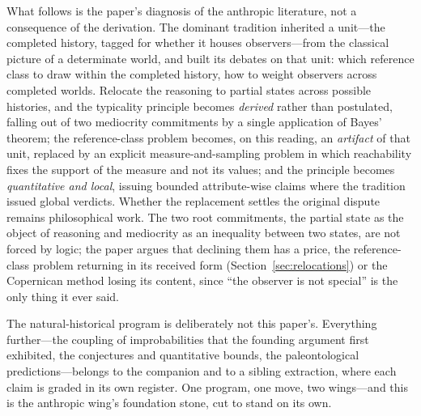 What follows is the paper's diagnosis of the anthropic literature, not a consequence of the derivation. The dominant tradition inherited a unit---the completed history, tagged for whether it houses observers---from the classical picture of a determinate world, and built its debates on that unit: which reference class to draw within the completed history, how to weight observers across completed worlds. Relocate the reasoning to partial states across possible histories, and the typicality principle becomes \emph{derived} rather than postulated, falling out of two mediocrity commitments by a single application of Bayes' theorem; the reference-class problem becomes, on this reading, an \emph{artifact} of that unit, replaced by an explicit measure-and-sampling problem in which reachability fixes the support of the measure and not its values; and the principle becomes \emph{quantitative and local}, issuing bounded attribute-wise claims where the tradition issued global verdicts. Whether the replacement settles the original dispute remains philosophical work. The two root commitments, the partial state as the object of reasoning and mediocrity as an inequality between two states, are not forced by logic; the paper argues that declining them has a price, the reference-class problem returning in its received form (Section~\ref{sec:relocations}) or the Copernican method losing its content, since ``the observer is not special'' is the only thing it ever said.

The natural-historical program is deliberately not this paper's. Everything further---the coupling of improbabilities that the founding argument first exhibited, the conjectures and quantitative bounds, the paleontological predictions---belongs to the companion and to a sibling extraction, where each claim is graded in its own register. One program, one move, two wings---and this is the anthropic wing's foundation stone, cut to stand on its own.


